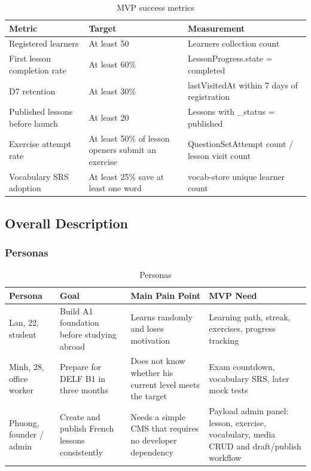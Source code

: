 \begin{table}[H]
\centering
\begin{tabularx}{\linewidth}{X X X}
\toprule
Metric & Target & Measurement \\
\midrule
Registered learners & At least 50 & Learners collection count \\
First lesson completion rate & At least 60\% & LessonProgress.state = completed \\
D7 retention & At least 30\% & lastVisitedAt within 7 days of registration \\
Published lessons before launch & At least 20 & Lessons with \_status = published \\
Exercise attempt rate & At least 50\% of lesson openers submit an exercise & QuestionSetAttempt count / lesson visit count \\
Vocabulary SRS adoption & At least 25\% save at least one word & vocab-store unique learner count \\
\bottomrule
\end{tabularx}
\caption{MVP success metrics}
\end{table}

\subsection{Overall Description}

\subsubsection{Personas}

\begin{table}[H]
\centering
\begin{tabularx}{\linewidth}{X X X X}
\toprule
Persona & Goal & Main Pain Point & MVP Need \\
\midrule
Lan, 22, student & Build A1 foundation before studying abroad & Learns randomly and loses motivation & Learning path, streak, exercises, progress tracking \\
Minh, 28, office worker & Prepare for DELF B1 in three months & Does not know whether his current level meets the target & Exam countdown, vocabulary SRS, later mock tests \\
Phuong, founder / admin & Create and publish French lessons consistently & Needs a simple CMS that requires no developer dependency & Payload admin panel: lesson, exercise, vocabulary, media CRUD and draft/publish workflow \\
\bottomrule
\end{tabularx}
\caption{Personas}
\end{table}

